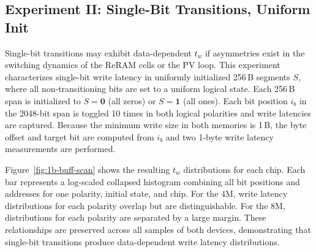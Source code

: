 \subsection{Experiment II: Single-Bit Transitions, Uniform Init}

\label{sec:brewrc-exp2}

Single-bit transitions may exhibit data-dependent $t_w$ if asymmetries
exist in the switching dynamics of the ReRAM cells or the PV loop. This
experiment characterizes single-bit write latency in uniformly
initialized 256\,B segments $S$, where all non-transitioning bits are
set to a uniform logical state. Each 256\,B span is initialized to
$S=\mathbf{0}$ (all zeros) or $S=\mathbf{1}$ (all ones). Each bit
position $i_b$ in the 2048-bit span is toggled 10 times in both logical
polarities and write latencies are captured. Because the minimum write
size in both memories is 1\,B, the byte offset and target bit are
computed from $i_b$ and two 1-byte write latency measurements are
performed.



Figure~\ref{fig:1b-buff-scan} shows the resulting $t_w$ distributions
for each chip. Each bar represents a log-scaled collapsed histogram
combining all bit positions and addresses for one polarity, initial
state, and chip. For the 4M, write latency distributions for each
polarity overlap but are distinguishable. For the 8M, distributions for
each polarity are separated by a large margin. These relationships are
preserved across all samples of both devices, demonstrating that
single-bit transitions produce data-dependent write latency
distributions.

